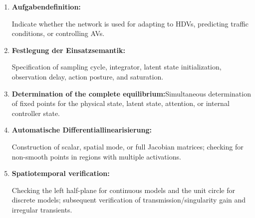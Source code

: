 \documentclass[11pt,a4paper,openany]{book}
\numberwithin{equation}{chapter}
\numberwithin{figure}{chapter}
\numberwithin{table}{chapter}
\begin{document}
\begin{tcolorbox}[keybox,title=\textbf{Nine steps from the learning model to the stability conclusion}]
\begin{enumerate}[leftmargin=1.6em,itemsep=3pt]
\item \textbf{Aufgabendefinition:}






Indicate whether the network is used for adapting to HDVs, predicting traffic conditions, or controlling AVs.









\item \textbf{Festlegung der Einsatzsemantik:}






Specification of sampling cycle, integrator, latent state initialization, observation delay, action posture, and saturation.









\item \textbf{Determination of the complete equilibrium:}Simultaneous determination of fixed points for the physical state, latent state, attention, or internal controller state.









\item \textbf{Automatische Differentiallinearisierung:}






Construction of scalar, spatial mode, or full Jacobian matrices; checking for non-smooth points in regions with multiple activations.









\item \textbf{Spatiotemporal verification:}






Checking the left half-plane for continuous models and the unit circle for discrete models; subsequent verification of transmission/singularity gain and irregular transients.










\end{enumerate}
\end{tcolorbox}
\end{document}
